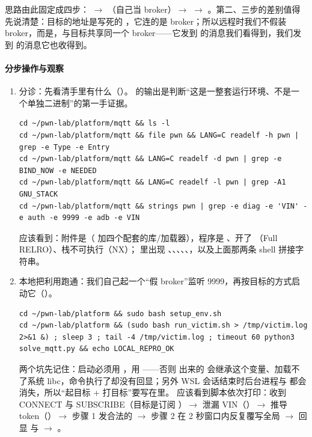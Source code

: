 \documentclass[UTF8,12pt,oneside]{ctexbook}
\begin{document}
思路由此固定成四步： $\rightarrow$ （自己当 broker）$\rightarrow$  $\rightarrow$ 。第二、三步的差别值得先说清楚：目标的地址是写死的 ，它连的是 broker；所以远程时我们不假装 broker，而是，与目标共享同一个 broker——它发到  的消息我们看得到，我们发到  的消息它也收得到。

\paragraph{分步操作与观察}
\begin{enumerate}[label=\arabic*.]
\item 分诊：先看清手里有什么（）。 的输出是判断“这是一整套运行环境、不是一个单独二进制”的第一手证据。
\begin{lstlisting}
cd ~/pwn-lab/platform/mqtt && ls -l
cd ~/pwn-lab/platform/mqtt && file pwn && LANG=C readelf -h pwn | grep -e Type -e Entry
cd ~/pwn-lab/platform/mqtt && LANG=C readelf -d pwn | grep -e BIND_NOW -e NEEDED
cd ~/pwn-lab/platform/mqtt && LANG=C readelf -l pwn | grep -A1 GNU_STACK
cd ~/pwn-lab/platform/mqtt && strings pwn | grep -e diag -e 'VIN' -e auth -e 9999 -e adb -e VIN
\end{lstlisting}
应该看到：附件是（ 加四个配套的库/加载器），程序是 、开了 （Full RELRO）、栈不可执行（NX）； 里出现 、、、、、，以及上面那两条 shell 拼接字符串。
\item 本地把利用跑通：我们自己起一个“假 broker”监听 9999，再按目标的方式启动它（）。
\begin{lstlisting}
cd ~/pwn-lab/platform && sudo bash setup_env.sh
cd ~/pwn-lab/platform && (sudo bash run_victim.sh > /tmp/victim.log 2>&1 &) ; sleep 3 ; tail -4 /tmp/victim.log ; timeout 60 python3 solve_mqtt.py && echo LOCAL_REPRO_OK
\end{lstlisting}
两个坑先记住：启动必须用 ，用 ——否则  出来的  会继承这个变量、加载不了系统 libc，命令执行了却没有回显；另外 WSL 会话结束时后台进程与  都会消失，所以“起目标 + 打目标”要写在里。
应该看到脚本依次打印：收到 CONNECT 与 SUBSCRIBE（目标是订阅 ）$\rightarrow$ 泄漏 VIN（）$\rightarrow$ 推导 token（）$\rightarrow$ 步骤 1 发合法的  $\rightarrow$ 步骤 2 在 2 秒窗口内反复覆写全局  $\rightarrow$  回显  与  $\rightarrow$ 。

\end{enumerate}
\end{document}
